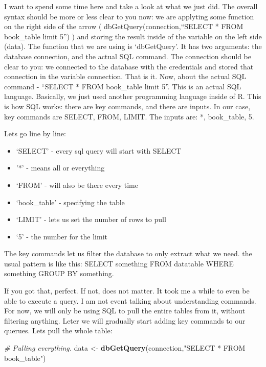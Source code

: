 \documentclass[]{book}
\newenvironment{Shaded}{\begin{snugshade}}{\end{snugshade}}
\newcommand{\CommentTok}[1]{\textcolor[rgb]{0.56,0.35,0.01}{\textit{#1}}}
\newcommand{\KeywordTok}[1]{\textcolor[rgb]{0.13,0.29,0.53}{\textbf{#1}}}
\newcommand{\NormalTok}[1]{#1}
\newcommand{\StringTok}[1]{\textcolor[rgb]{0.31,0.60,0.02}{#1}}
\providecommand{\tightlist}{%
  \setlength{\itemsep}{0pt}\setlength{\parskip}{0pt}}
\begin{document}
I want to spend some time here and take a look at what we just did. The overall syntax should be more or less clear to you now: we are applyting some function on the right side of the arrow ( dbGetQuery(connection,``SELECT * FROM book\_table limit 5'') ) and storing the result inside of the variable on the left side (data). The function that we are using is `dbGetQuery'. It has two arguments: the database connection, and the actual SQL command. The connection should be clear to you: we connected to the database with the credentials and stored that connection in the variable connection. That is it. Now, about the actual SQL command - ``SELECT * FROM book\_table limit 5''. This is an actual SQL language. Basically, we just used another programming language inside of R. This is how SQL works: there are key commands, and there are inputs. In our case, key commands are SELECT, FROM, LIMIT. The inputs are: *, book\_table, 5.

Lets go line by line:

\begin{itemize}
\tightlist
\item
  `SELECT' - every sql query will start with SELECT
\item
  '*' - means all or everything
\item
  `FROM' - will also be there every time
\item
  `book\_table' - specifying the table
\item
  `LIMIT' - lets us set the number of rows to pull
\item
  `5' - the number for the limit
\end{itemize}

The key commands let us filter the database to only extract what we need. the usual pattern is like this: SELECT something FROM datatable WHERE something GROUP BY something.

If you got that, perfect. If not, does not matter. It took me a while to even be able to execute a query. I am not event talking about understanding commands. For now, we will only be using SQL to pull the entire tables from it, without filtering anything. Leter we will gradually start adding key commands to our querues. Lets pull the whole table:

\begin{Shaded}
\begin{Highlighting}[]
\CommentTok{# Pulling everything.}
\NormalTok{data <-}\StringTok{ }\KeywordTok{dbGetQuery}\NormalTok{(connection,}\StringTok{"SELECT * FROM book_table"}\NormalTok{)}
\end{Highlighting}
\end{Shaded}
\end{document}
